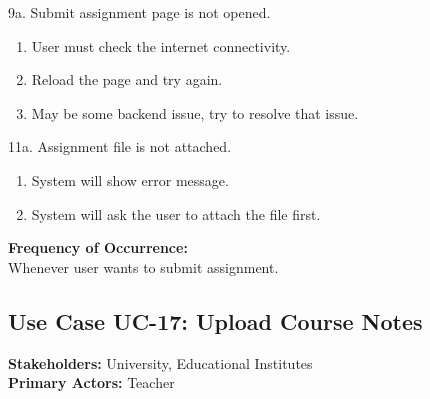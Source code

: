 9a. Submit assignment page is not opened.
\begin{enumerate}
\item User must check the internet connectivity.
\item Reload the page and try again.
\item May be some backend issue, try to resolve that issue.
\end{enumerate}
11a. Assignment file is not attached.
\begin{enumerate}
\item System will show error message.
\item System will ask the user to attach the file first.
\end{enumerate}
\textbf{Frequency of Occurrence:}\\
Whenever user wants to submit assignment.



\subsection{Use Case UC-17: Upload Course Notes}
\textbf{Stakeholders: } University, Educational Institutes \\
\textbf{Primary Actors: }Teacher \\

